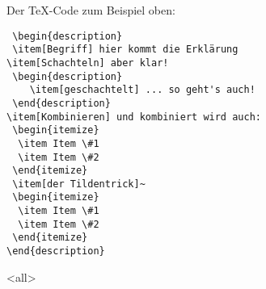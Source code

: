 \begin{frame}[fragile]
Der TeX-Code zum Beispiel oben:
\begin{lstlisting}
 \begin{description}
 \item[Begriff] hier kommt die Erklärung
\item[Schachteln] aber klar!
 \begin{description}
	\item[geschachtelt] ... so geht's auch!
 \end{description}
\item[Kombinieren] und kombiniert wird auch:
 \begin{itemize}
  \item Item \#1
  \item Item \#2
 \end{itemize}
 \item[der Tildentrick]~
 \begin{itemize}
  \item Item \#1
  \item Item \#2
 \end{itemize}
\end{description}
\end{lstlisting}



\mode
<all>

\end{frame}
\newpage

